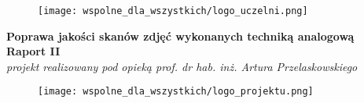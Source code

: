 \documentclass[]{mwart}
\begin{document}
\thispagestyle{empty}

\begin{figure}[h]
    \centering
    \texttt{[image: wspolne\_dla\_wszystkich/logo\_uczelni.png]}
\end{figure}


\begin{center}
    {\LARGE \textbf{Poprawa jakości skanów zdjęć wykonanych techniką analogową
        }} \\[0.3cm]
    {\large \textbf{Raport II}} \\[0.2cm]
    \textit{projekt realizowany pod opieką prof. dr hab. inż. Artura Przelaskowskiego}

\end{center}

\begin{figure}[h]
    \centering
    \texttt{[image: wspolne\_dla\_wszystkich/logo\_projektu.png]}
\end{figure}

\newpage
\tableofcontents{}
\end{document}
